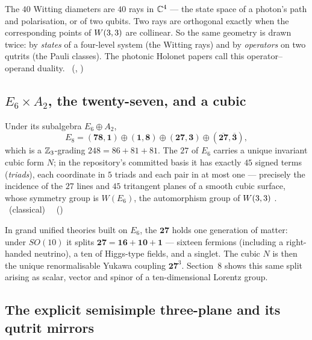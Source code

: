 \begin{physical}
The $40$ Witting diameters are $40$ rays in $\mathbb{C}^4$ --- the state space of a photon's path
and polarisation, or of two qubits. Two rays are orthogonal exactly when the corresponding
points of $W(3,3)$ are collinear. So the same geometry is drawn twice: by \emph{states} of a
four-level system (the Witting rays) and by \emph{operators} on two qutrits (the Pauli
classes). The photonic Holonet papers call this operator--operand duality.
\tierC\ (, )
\end{physical}

\subsection{\texorpdfstring{$E_6\times A_2$}{E6 x A2}, the twenty-seven, and a cubic}

Under its subalgebra $E_6\oplus A_2$,
\[
E_8=(\mathbf{78},\mathbf1)\oplus(\mathbf1,\mathbf8)\oplus(\mathbf{27},\mathbf3)\oplus(\overline{\mathbf{27}},\overline{\mathbf3}),
\]
which is a $\mathbb{Z}_3$-grading $248=86+81+81$. The $27$ of $E_6$ carries a unique invariant
cubic form $N$; in the repository's committed basis it has exactly $45$ signed terms
(\emph{triads}), each coordinate in $5$ triads and each pair in at most one ---
precisely the incidence of the $27$ lines and $45$ tritangent planes of a smooth cubic
surface, whose symmetry group is $W(E_6)$, the automorphism group of $W(3,3)$ \cite{Garibaldi}.
\tierT\ (classical) \ \tierC\ ()

\begin{physical}
In grand unified theories built on $E_6$, the $\mathbf{27}$ holds one generation of
matter: under $SO(10)$ it splits $\mathbf{27}=\mathbf{16}+\mathbf{10}+\mathbf1$ ---
sixteen fermions (including a right-handed neutrino), a ten of Higgs-type fields, and a
singlet. The cubic $N$ is then the unique renormalisable Yukawa coupling
$\mathbf{27}^3$. Section~8 shows this same split arising as scalar, vector and spinor of a
ten-dimensional Lorentz group.
\end{physical}

\subsection{The explicit semisimple three-plane and its qutrit mirrors}

